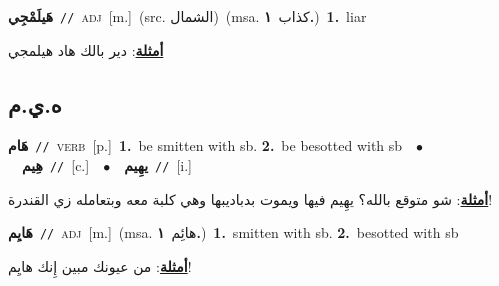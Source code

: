 \documentclass[10pt,a4paper,twoside]{article} %
\begin{document}
\begin{multicols}{2}
{\setlength\topsep{0pt}\textbf{\foreignlanguage{arabic}{هَيلَمْجِي}}\ {\color{gray}\texttt{//}\color{black}}\ \textsc{adj}\ [m.]\ (src. \color{gray}\foreignlanguage{arabic}{الشمال}\color{black})\ \color{gray}(msa. \foreignlanguage{arabic}{كذاب}~\foreignlanguage{arabic}{\textbf{١.}})\color{black}\ \textbf{1.}~liar\  \begin{flushright}\color{gray}\foreignlanguage{arabic}{\textbf{\underline{\foreignlanguage{arabic}{أمثلة}}}: دير بالك هاد هيلمجي}\end{flushright}\color{black}} \vspace{2mm}

\vspace{-3mm}
\subsection*{\color{blue}\foreignlanguage{arabic}{ه.ي.م}\color{blue}{}} 

{\setlength\topsep{0pt}\textbf{\foreignlanguage{arabic}{هَام}}\ {\color{gray}\texttt{//}\color{black}}\ \textsc{verb}\ [p.]\ \textbf{1.}~be smitten with sb.  \textbf{2.}~be besotted with sb\ \ $\bullet$\ \ \setlength\topsep{0pt}\textbf{\foreignlanguage{arabic}{هِيم}}\ {\color{gray}\texttt{//}\color{black}}\ [c.]\ \ $\bullet$\ \ \setlength\topsep{0pt}\textbf{\foreignlanguage{arabic}{يهِيم}}\ {\color{gray}\texttt{//}\color{black}}\ [i.]\  \begin{flushright}\color{gray}\foreignlanguage{arabic}{\textbf{\underline{\foreignlanguage{arabic}{أمثلة}}}: شو متوقع بالله؟ يهِيم فيها ويموت بدباديبها وهي كلبة معه وبتعامله زي القندرة!}\end{flushright}\color{black}} \vspace{2mm}

{\setlength\topsep{0pt}\textbf{\foreignlanguage{arabic}{هَايِم}}\ {\color{gray}\texttt{//}\color{black}}\ \textsc{adj}\ [m.]\ \color{gray}(msa. \foreignlanguage{arabic}{هائِم}~\foreignlanguage{arabic}{\textbf{١.}})\color{black}\ \textbf{1.}~smitten with sb.  \textbf{2.}~besotted with sb\  \begin{flushright}\color{gray}\foreignlanguage{arabic}{\textbf{\underline{\foreignlanguage{arabic}{أمثلة}}}: من عيونك مبين إِنك هايِم!}\end{flushright}\color{black}} \vspace{2mm}


\end{multicols}
\end{document}
